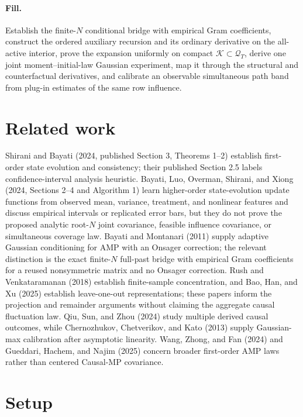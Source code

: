\documentclass{article}
\begin{document}
\paragraph{Fill.} Establish the finite-\(N\) conditional bridge with empirical Gram coefficients, construct the ordered auxiliary recursion and its ordinary derivative on the all-active interior, prove the expansion uniformly on compact \(\mathcal K\subset\mathcal Q_T\), derive one joint moment--initial-law Gaussian experiment, map it through the structural and counterfactual derivatives, and calibrate an observable simultaneous path band from plug-in estimates of the same row influence.

\section{Related work}

Shirani and Bayati (2024, published Section 3, Theorems 1--2) establish first-order state evolution and consistency; their published Section 2.5 labels confidence-interval analysis heuristic. Bayati, Luo, Overman, Shirani, and Xiong (2024, Sections 2--4 and Algorithm 1) learn higher-order state-evolution update functions from observed mean, variance, treatment, and nonlinear features and discuss empirical intervals or replicated error bars, but they do not prove the proposed analytic root-\(N\) joint covariance, feasible influence covariance, or simultaneous coverage law. Bayati and Montanari (2011) supply adaptive Gaussian conditioning for AMP with an Onsager correction; the relevant distinction is the exact finite-\(N\) full-past bridge with empirical Gram coefficients for a reused nonsymmetric matrix and no Onsager correction. Rush and Venkataramanan (2018) establish finite-sample concentration, and Bao, Han, and Xu (2025) establish leave-one-out representations; these papers inform the projection and remainder arguments without claiming the aggregate causal fluctuation law. Qiu, Sun, and Zhou (2024) study multiple derived causal outcomes, while Chernozhukov, Chetverikov, and Kato (2013) supply Gaussian-max calibration after asymptotic linearity. Wang, Zhong, and Fan (2024) and Gueddari, Hachem, and Najim (2025) concern broader first-order AMP laws rather than centered Causal-MP covariance.

\section{Setup}
\end{document}
